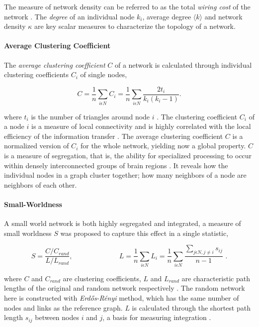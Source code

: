 \documentclass[fleqn,10pt]{wlpeerj}
\begin{document}
The measure of network density can be referred to as the total \textit{wiring cost} of the network \citep{RUB10}. The \textit{degree} of an individual node $k_i$, average degree  $\langle k \rangle$ and network density $\kappa$ are key scalar measures to characterize the topology of a network. 

\paragraph{Average Clustering Coefficient}

The \textit{average clustering coefficient} $C$ of a network is calculated through individual clustering coefficients $C_i$ of single nodes,

\begin{equation}
C = \frac{1}{n} \sum\limits_{i\epsilon N}C_i = \frac{1}{n}\sum\limits_{i\epsilon N} \frac{2t_i}{k_i(k_i -1)} .
\end{equation} 

where $t_i$ is the number of triangles around node $i$ \citep{WAT98}. The clustering coefficient $C_i$ of a node $i$ is a measure of local connectivity and is highly correlated with the local efficiency of the information transfer \citep{LAT01}. The average clustering coefficient $C$ is a normalized version of $C_i$ for the whole network, yielding now a global property. $C$ is a measure of segregation, that is, the ability for specialized processing to occur within densely interconnected groups of brain regions \citep{RUB10}. It reveals how the individual nodes in a graph cluster together; how many neighbors of a node are neighbors of each other. 


\paragraph{Small-Worldness}

A small world network is both highly segregated and integrated, a measure of small worldness $S$ was proposed to capture this effect in a single statistic,

\begin{equation}
S = \frac{C/C_{rand}}{L/L_{rand}}, \,\,\,\,\,\,\,\,\,\,\,\,\,\,\,\,\,\,\,\,\,\,\,\,\,\,\,\,\,\,\,\,\,\,\,\,\,\,\,\, L = \frac{1}{n}\sum\limits_{i \epsilon N} L_i = \frac{1}{n}\sum\limits_{i \epsilon N} \frac{\sum\limits_{j \epsilon N, j \neq i }s_{ij}}{n-1 } \,\, .
\end{equation}
 
where $C$ and $C_{rand}$ are clustering coefficients, $L$ and $L_{rand}$ are characteristic path lengths of the original and random network respectively \citep{HUM08}. The random network here is constructed with \textit{Erd\H{o}s-R\'{e}nyi} method, which has the same number of nodes and links as the reference graph. $L$ is calculated through the shortest path length $s_{ij}$ between nodes $i$ and $j$, a basis for measuring integration \citep{RUB10}. 
\end{document}
